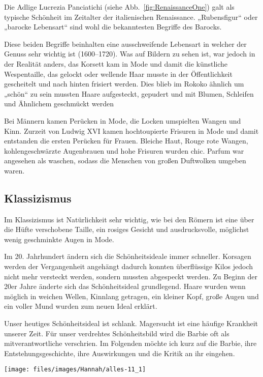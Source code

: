 Die Adlige Lucrezia Panciatichi (siehe Abb.~\vref{fig:RenaissanceOne}) galt als typische
Schönheit im Zeitalter der italienischen Renaissance. „Rubensfigur“ oder „barocke Lebensart“ sind
wohl die bekanntesten Begriffe des Barocks.


Diese beiden Begriffe beinhalten eine ausschweifende Lebensart in welcher der Genuss sehr wichtig ist
(1600--1720). Was auf Bildern zu sehen ist, war jedoch in der Realität anders, das Korsett kam in
Mode und damit die künstliche Wespentaille, das gelockt oder wellende Haar musste in der
Öffentlichkeit gescheitelt und nach hinten frisiert werden.
Dies blieb im Rokoko ähnlich um „schön“ zu sein mussten Haare aufgesteckt, gepudert und mit Blumen,
Schleifen und Ähnlichem geschmückt werden

Bei Männern kamen Perücken in Mode, die Locken umspielten Wangen und Kinn.
Zurzeit von Ludwig XVI kamen hochtoupierte Frisuren in Mode und damit entstanden die ersten Perücken
für Frauen. Bleiche Haut, Rouge rote Wangen, kohlengeschwärzte Augenbrauen und hohe Frisuren wurden
chic. Parfum war angesehen als waschen, sodass die Menschen
von großen Duftwolken umgeben waren.

\subsection{Klassizismus}
Im Klassizismus ist Natürlichkeit sehr wichtig, wie bei den Römern ist eine über die Hüfte
verschobene Taille, ein rosiges Gesicht und ausdrucksvolle, möglichst wenig geschminkte Augen in
Mode.

Im 20. Jahrhundert ändern sich die Schönheitsideale immer schneller. Korsagen werden der
Vergangenheit angehängt dadurch konnten überflüssige Kilos jedoch nicht mehr versteckt werden,
sondern mussten abgespeckt werden. Zu Beginn der 20er Jahre änderte sich das Schönheitsideal
grundlegend. Haare wurden wenn möglich in weichen Wellen, Kinnlang getragen, ein kleiner Kopf, große
Augen und ein voller Mund wurden zum neuen Ideal erklärt.

Unser heutiges Schönheitsideal ist schlank. Magersucht ist eine häufige Krankheit unserer Zeit. Für
unser verdrehtes Schönheitsbild wird die Barbie oft als mitverantwortliche verschrien. Im Folgenden
möchte ich kurz auf die Barbie, ihre Entstehungsgeschichte, ihre Auswirkungen und die Kritik an ihr
eingehen.

\bigskip
\begin{figurewrapper}
	\texttt{[image: files/images/Hannah/alles-11\_1]}%
\end{figurewrapper}

